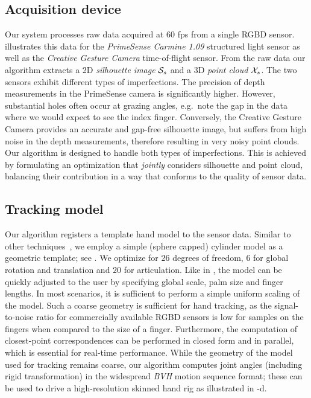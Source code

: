 \subsection*{Acquisition device}
Our system processes raw data acquired at 60 fps from a single RGBD sensor.  illustrates this data for the \emph{PrimeSense Carmine 1.09} structured light sensor as well as the \emph{Creative Gesture Camera} time-of-flight sensor. From the raw data our algorithm extracts a 2D \emph{silhouette image} $\mathcal{S}_{s}$ and a 3D \emph{point cloud} $\mathcal{X}_{s}$. The two sensors exhibit different types of imperfections. The precision of depth measurements in the PrimeSense camera is significantly higher. However, substantial holes often occur at grazing angles, e.g.\ note the gap in the data where we would expect to see the index finger. Conversely, the Creative Gesture Camera provides an accurate and gap-free silhouette image, but suffers from high noise in the depth measurements, therefore resulting in very noisy point clouds. Our algorithm is designed to handle both types of imperfections. This is achieved by formulating an optimization that \emph{jointly} considers silhouette and point cloud, balancing their contribution in a way that conforms to the quality of sensor data.

\subsection*{Tracking model}
Our algorithm registers a template hand model to the sensor data. Similar to other techniques~\cite{oiko2011hand,schroder2014real}, we employ a simple (sphere capped) cylinder model as a geometric template; see .  We optimize for $26$ degrees of freedom, $6$ for global rotation and translation and $20$ for articulation.
% 
Like in \cite{melax2013dynamics}, the model can be quickly adjusted to the user by specifying global scale, palm size and finger lengths. In most scenarios, it is sufficient to perform a simple uniform scaling of the model.
% 
Such a coarse geometry is sufficient for hand tracking, as the signal-to-noise ratio for commercially available RGBD sensors is low for samples on the fingers when compared to the size of a finger. Furthermore, the computation of closest-point correspondences can be performed in closed form and in parallel, which is essential for real-time performance.
% 
% 
While the geometry of the model used for tracking remains coarse, our algorithm computes joint angles (including rigid transformation) in the widespread \emph{BVH} motion sequence format; these can be used to drive a high-resolution skinned hand rig as illustrated in -d.
%

